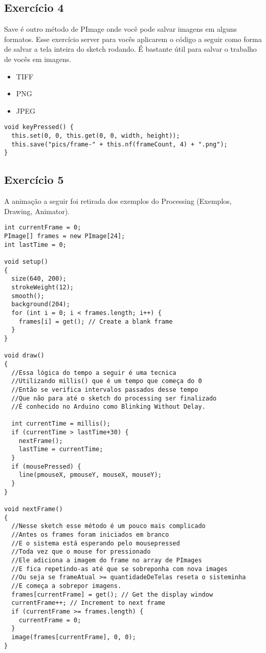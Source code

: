 \documentclass[12pt]{article}
\begin{document}
\subsection{Exercício 4}

\qquad Save é outro método de PImage onde você pode salvar imagens em alguns formatos. Esse exercício server para vocês aplicarem o código a seguir como forma de salvar a tela inteira do sketch rodando. É bastante útil para salvar o trabalho de vocês em imagens.

\begin{itemize}
\item TIFF
\item PNG
\item JPEG
\end{itemize}


\begin{verbatim}
void keyPressed() {
  this.set(0, 0, this.get(0, 0, width, height));
  this.save("pics/frame-" + this.nf(frameCount, 4) + ".png");
}
\end{verbatim}

\subsection{Exercício 5}
A animação a seguir foi retirada dos exemplos do Processing (Exemplos, Drawing, Animator).

\begin{verbatim}
int currentFrame = 0;
PImage[] frames = new PImage[24];
int lastTime = 0;

void setup() 
{
  size(640, 200);
  strokeWeight(12);
  smooth();
  background(204);
  for (int i = 0; i < frames.length; i++) {
    frames[i] = get(); // Create a blank frame
  }
}

void draw() 
{
  //Essa lógica do tempo a seguir é uma tecnica
  //Utilizando millis() que é um tempo que começa do 0
  //Então se verifica intervalos passados desse tempo
  //Que não para até o sketch do processing ser finalizado
  //É conhecido no Arduino como Blinking Without Delay.

  int currentTime = millis();
  if (currentTime > lastTime+30) {
    nextFrame();
    lastTime = currentTime;
  }
  if (mousePressed) {
    line(pmouseX, pmouseY, mouseX, mouseY);
  }
}

void nextFrame() 
{
  //Nesse sketch esse método é um pouco mais complicado
  //Antes os frames foram iniciados em branco
  //E o sistema está esperando pelo mousepressed
  //Toda vez que o mouse for pressionado
  //Ele adiciona a imagem do frame no array de PImages
  //E fica repetindo-as até que se sobreponha com nova images
  //Ou seja se frameAtual >= quantidadeDeTelas reseta o sisteminha
  //E começa a sobrepor imagens.
  frames[currentFrame] = get(); // Get the display window
  currentFrame++; // Increment to next frame
  if (currentFrame >= frames.length) {
    currentFrame = 0;
  }
  image(frames[currentFrame], 0, 0);
}
\end{verbatim}
\end{document}
